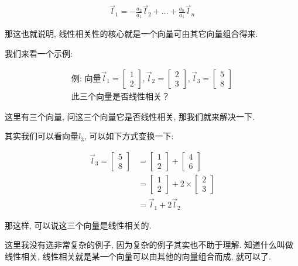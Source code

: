 \begin{align*}
  \vec l_1 = -\frac{a_2}{a_1} \vec l_2 + ... + \frac{a_n}{a_1} \vec l_n
\end{align*}

那这也就说明, 线性相关性的核心就是一个向量可由其它向量组合得来. 

我们来看一个示例: 

\begin{align*}
  \mbox{例: 向量}\vec l_1 = \begin{bmatrix} 1 \\ 2 \end{bmatrix}, \vec l_2 = \begin{bmatrix} 2 \\ 3 \end{bmatrix},\vec l_3 = \begin{bmatrix} 5 \\ 8 \end{bmatrix} \\
  \mbox{此三个向量是否线性相关？}
\end{align*}

这里有三个向量, 问这三个向量它是否线性相关, 那我们就来解决一下. 

其实我们可以看向量$l_3$, 可以如下方式变换一下: 

\begin{align*}
  \vec l_3 = \begin{bmatrix} 5 \\ 8 \end{bmatrix} & = \begin{bmatrix} 1 \\ 2 \end{bmatrix} + \begin{bmatrix} 4 \\ 6 \end{bmatrix} \\
  & = \begin{bmatrix} 1 \\ 2 \end{bmatrix} + 2 \times \begin{bmatrix} 2 \\ 3 \end{bmatrix} \\
  & = \vec l_1 + 2 \vec l_2
\end{align*}

那这样, 可以说这三个向量是线性相关的. 

这里我没有选非常复杂的例子, 因为复杂的例子其实也不助于理解. 知道什么叫做线性相关, 线性相关就是某一个向量可以由其他的向量组合而成, 就可以了. 

